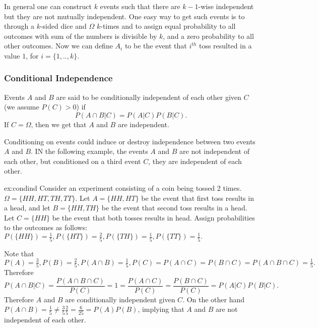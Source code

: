 \begin{remark}
In general one can construct $k$ events such that there are $k-1$-wise independent but they are not mutually independent. One easy way to get such events is to through a $k$-sided dice and $\Omega$ $k$-times and to assign equal probability to all outcomes with sum of the numbers is divisible by $k$, and a zero probability to all other outcomes. Now we can define $A_i$ to be the event that $i^{th}$ toss resulted in a value $1$, for $i=\{1,..,k\}$.
\end{remark}

\subsubsection{Conditional Independence}
Events $A$ and $B$ are said to be conditionally independent of each other given $C$ (we assume $P(C)>0$) if
$$ P(A \cap B | C) = P(A|C) P(B|C).$$
If $C=\Omega$, then we get that $A$ and $B$ are independent.


Conditioning on events could induce or destroy independence between two events $A$ and $B$. IN the following example, the events $A$ and $B$ are not independent of each other, but conditioned on a third event $C$, they are independent of each other.

\begin{exmp}{ex:condind}
Consider an experiment consisting of a coin being tossed 2 times.  $\Omega=\{HH,HT,TH,TT\}.$ Let $A=\{HH,HT\}$ be the event that first toss results in a head, and let $B=\{HH,TH\}$ be the event that second toss results in a head. Let $C=\{HH\}$ be the event that both tosses results in head. Assign probabilities to the outcomes as follows: $P(\{HH\})=\frac{1}{5}, P(\{HT\})=\frac{2}{5},P(\{TH\})=\frac{1}{5},P(\{TT\})=\frac{1}{5}.$

Note that $P(A)=\frac{3}{5}, P(B)=\frac{2}{5}, P(A\cap B)=\frac{1}{5}, P(C)=P(A\cap C)=P(B\cap C)=P(A\cap B \cap C)=\frac{1}{5}.$ Therefore
$$ P(A\cap B|C) = \frac{P(A\cap B \cap C)}{P(C)}=1 = \frac{P(A\cap C)}{P(C)} = \frac{P(B\cap C)}{P(C)} = P(A|C) P(B|C).$$
Therefore $A$ and $B$ are conditionally independent given $C$. On the other hand $P(A \cap B)=\frac{1}{5} \neq \frac{3}{5} \frac{2}{5} = \frac{6}{25} = P(A)P(B)$, implying that $A$ and $B$ are not independent of each other.
\end{exmp}

